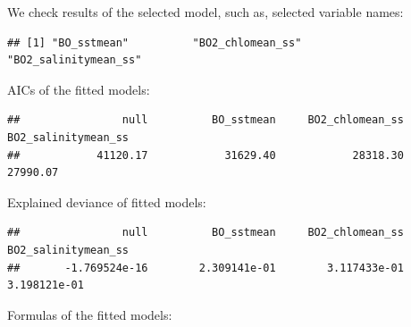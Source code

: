 \documentclass[
]{book}
\newenvironment{Shaded}{\begin{snugshade}}{\end{snugshade}}
\newcommand{\ControlFlowTok}[1]{\textcolor[rgb]{0.13,0.29,0.53}{\textbf{#1}}}
\newcommand{\FunctionTok}[1]{\textcolor[rgb]{0.13,0.29,0.53}{\textbf{#1}}}
\newcommand{\NormalTok}[1]{#1}
\newcommand{\SpecialCharTok}[1]{\textcolor[rgb]{0.81,0.36,0.00}{\textbf{#1}}}
\begin{document}
We check results of the selected model, such as, selected variable names:

\begin{Shaded}
\end{Shaded}

\begin{verbatim}
## [1] "BO_sstmean"          "BO2_chlomean_ss"     "BO2_salinitymean_ss"
\end{verbatim}

AICs of the fitted models:

\begin{Shaded}
\end{Shaded}

\begin{verbatim}
##                null          BO_sstmean     BO2_chlomean_ss BO2_salinitymean_ss 
##            41120.17            31629.40            28318.30            27990.07
\end{verbatim}

Explained deviance of fitted models:

\begin{Shaded}
\end{Shaded}

\begin{verbatim}
##                null          BO_sstmean     BO2_chlomean_ss BO2_salinitymean_ss 
##       -1.769524e-16        2.309141e-01        3.117433e-01        3.198121e-01
\end{verbatim}

Formulas of the fitted models:

\begin{Shaded}
\end{Shaded}
\end{document}
